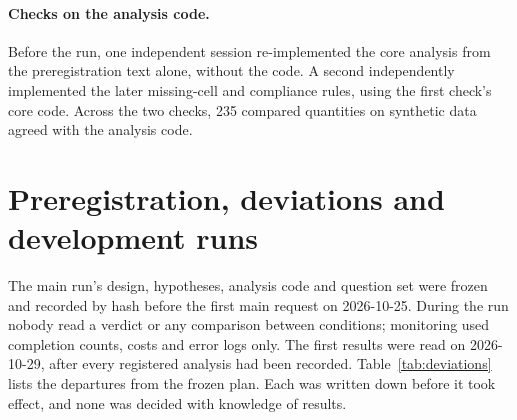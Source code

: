 \paragraph{Checks on the analysis code.} Before the run, one independent session re-implemented the core analysis
from the preregistration text alone, without the code. A second independently implemented the later missing-cell and
compliance rules, using the first check's core code. Across the two checks, 235 compared quantities on synthetic data
agreed with the analysis code.

\section{Preregistration, deviations and development runs}
\label{app:deviations}

The main run's design, hypotheses, analysis code and question set were frozen and recorded by hash before the first
main request on 2026-10-25. During the run nobody read a verdict or any comparison between conditions; monitoring
used completion counts, costs and error logs only. The first results were read on 2026-10-29, after every registered
analysis had been recorded. Table~\ref{tab:deviations} lists the departures from the frozen plan. Each was written down
before it took effect, and none was decided with knowledge of results.

